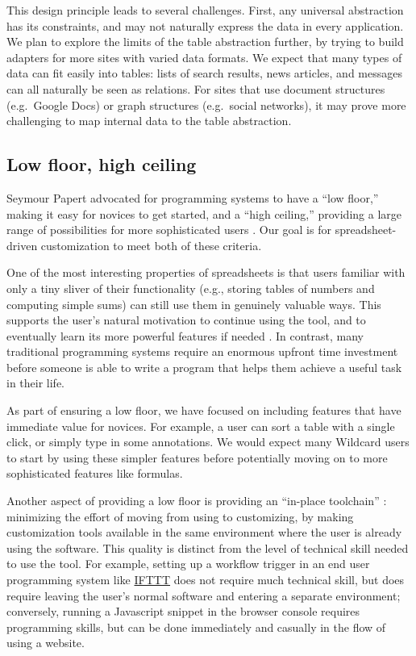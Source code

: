 \documentclass[english,submission]{programming}
\begin{document}
This design principle leads to several challenges. First, any universal
abstraction has its constraints, and may not naturally express the data
in every application. We plan to explore the limits of the table
abstraction further, by trying to build adapters for more sites with
varied data formats. We expect that many types of data can fit easily
into tables: lists of search results, news articles, and messages can
all naturally be seen as relations. For sites that use document
structures (e.g.~Google Docs) or graph structures (e.g.~social
networks), it may prove more challenging to map internal data to the
table abstraction.

\hypertarget{low-floor-high-ceiling}{%
\subsection{Low floor, high ceiling}\label{low-floor-high-ceiling}}

Seymour Papert advocated for programming systems to have a ``low
floor,'' making it easy for novices to get started, and a ``high
ceiling,'' providing a large range of possibilities for more
sophisticated users \autocite{resnick2016}. Our goal is for
spreadsheet-driven customization to meet both of these criteria.

One of the most interesting properties of spreadsheets is that users
familiar with only a tiny sliver of their functionality (e.g., storing
tables of numbers and computing simple sums) can still use them in
genuinely valuable ways. This supports the user's natural motivation to
continue using the tool, and to eventually learn its more powerful
features if needed \autocite{nardi1991}. In contrast, many traditional
programming systems require an enormous upfront time investment before
someone is able to write a program that helps them achieve a useful task
in their life.

As part of ensuring a low floor, we have focused on including features
that have immediate value for novices. For example, a user can sort a
table with a single click, or simply type in some annotations. We would
expect many Wildcard users to start by using these simpler features
before potentially moving on to more sophisticated features like
formulas.

Another aspect of providing a low floor is providing an ``in-place
toolchain'' \autocite{inkandswitch2019}: minimizing the effort of moving
from using to customizing, by making customization tools available in
the same environment where the user is already using the software. This
quality is distinct from the level of technical skill needed to use the
tool. For example, setting up a workflow trigger in an end user
programming system like \href{https://ifttt.com/}{IFTTT} does not
require much technical skill, but does require leaving the user's normal
software and entering a separate environment; conversely, running a
Javascript snippet in the browser console requires programming skills,
but can be done immediately and casually in the flow of using a website.
\end{document}
